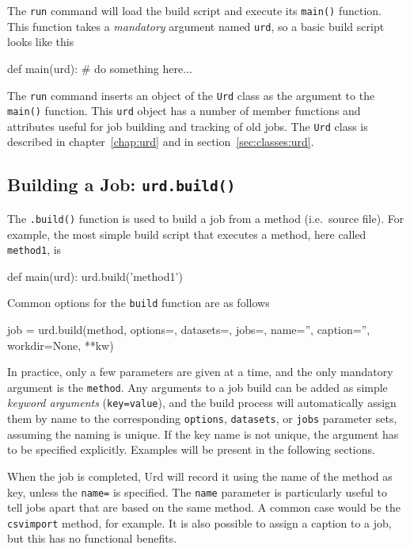 The \texttt{run} command will load the build script and execute
its \texttt{main()} function.  This function takes
a \textsl{mandatory} argument named \texttt{urd}, so a basic build
script looks like this
\begin{python}
def main(urd):
    # do something here...
\end{python}
The \texttt{run} command inserts an object of the \texttt{Urd} class
as the argument to the \texttt{main()} function.  This \texttt{urd}
object has a number of member functions and attributes useful for job
building and tracking of old jobs.  The \texttt{Urd} class is
described in chapter~\ref{chap:urd} and in
section~\ref{sec:classes:urd}.



\subsection{Building a Job: \texttt{urd.build()}}
The \texttt{.build()} function is used to build a job from a method
(i.e.\ source file).  For example, the most simple build script that
executes a method, here called \texttt{method1}, is
\begin{python}
def main(urd):
    urd.build('method1')
\end{python}
Common options for the \texttt{build} function are as follows
\begin{python}
    job = urd.build(method,
                    options={}, datasets={}, jobs={},
                    name='', caption='', workdir=None, **kw)
\end{python}
In practice, only a few parameters are given at a time, and the only
mandatory argument is the \texttt{method}.  Any arguments to a job
build can be added as simple \textsl{keyword arguments}
(\texttt{key=value}), and the build process will
automatically assign them by name to the corresponding
\texttt{options}, \texttt{datasets}, or \texttt{jobs} parameter
sets, assuming the naming is unique.  If the key name is not unique,
the argument has to be specified explicitly.  Examples will be present
in the following sections.

When the job is completed, Urd will record it using the name of the
method as key, unless the \texttt{name=} is specified.
The \texttt{name} parameter is particularly useful to tell jobs apart
that are based on the same method.  A common case would be
the \texttt{csvimport} method, for example.  It is also possible to
assign a caption to a job, but this has no functional benefits.

